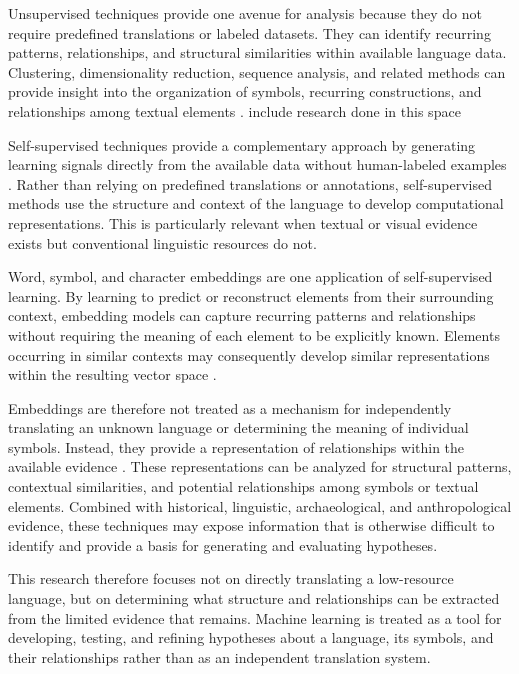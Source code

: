 \documentclass[preprint,12pt]{elsarticle}
\begin{document}
Unsupervised techniques provide one avenue for analysis because they do not require predefined translations or labeled datasets. They can identify recurring patterns, relationships, and structural similarities within available language data. Clustering, dimensionality reduction, sequence analysis, and related methods can provide insight into the organization of symbols, recurring constructions, and relationships among textual elements \cite{magueresse2020_low_resource_languages}. {include research done in this space}

Self-supervised techniques provide a complementary approach by generating learning signals directly from the available data without human-labeled examples \cite{almeida2019_text_classification_survey}. Rather than relying on predefined translations or annotations, self-supervised methods use the structure and context of the language to develop computational representations. This is particularly relevant when textual or visual evidence exists but conventional linguistic resources do not.

Word, symbol, and character embeddings are one application of self-supervised learning. By learning to predict or reconstruct elements from their surrounding context, embedding models can capture recurring patterns and relationships without requiring the meaning of each element to be explicitly known. Elements occurring in similar contexts may consequently develop similar representations within the resulting vector space \cite{almeida2019_text_classification_survey}.

Embeddings are therefore not treated as a mechanism for independently translating an unknown language or determining the meaning of individual symbols. Instead, they provide a representation of relationships within the available evidence \cite{almeida2019_text_classification_survey}. These representations can be analyzed for structural patterns, contextual similarities, and potential relationships among symbols or textual elements. Combined with historical, linguistic, archaeological, and anthropological evidence, these techniques may expose information that is otherwise difficult to identify and provide a basis for generating and evaluating hypotheses.

This research therefore focuses not on directly translating a low-resource language, but on determining what structure and relationships can be extracted from the limited evidence that remains. Machine learning is treated as a tool for developing, testing, and refining hypotheses about a language, its symbols, and their relationships rather than as an independent translation system.
\end{document}
